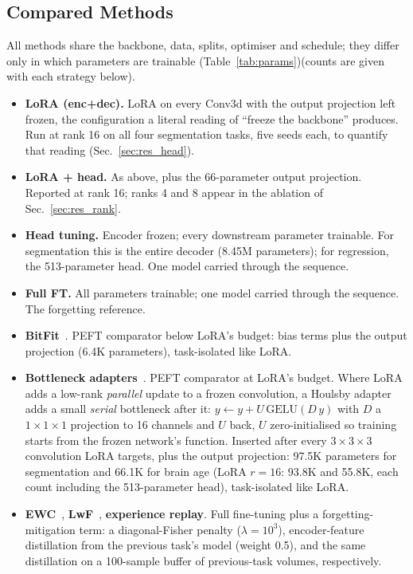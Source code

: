 \iffull\documentclass[journal]{IEEEtran}\else\documentclass[journal,twoside,web]{ieeecolor}\usepackage{generic}\fi
\begin{document}
\subsection{Compared Methods}
\label{sec:baselines}

All methods share the backbone, data, splits, optimiser and schedule; they differ only in which parameters are trainable \iffull(Table~\ref{tab:params})\else(counts are given with each strategy below)\fi.
\begin{itemize}
\item \textbf{LoRA (enc+dec).} LoRA on every Conv3d with the output projection left frozen, the configuration a literal reading of ``freeze the backbone'' produces. Run at rank 16 on all four segmentation tasks, five seeds each, to quantify that reading (Sec.~\ref{sec:res_head}).
\item \textbf{LoRA + head.} As above, plus the 66-parameter output projection. Reported at rank 16; ranks 4 and 8 appear in the ablation of Sec.~\ref{sec:res_rank}.
\item \textbf{Head tuning.} Encoder frozen; every downstream parameter trainable. For segmentation this is the entire decoder (8.45M parameters); for regression, the 513-parameter head. One model carried through the sequence.
\item \textbf{Full FT.} All parameters trainable; one model carried through the sequence. The forgetting reference.
\item \textbf{BitFit}~\cite{bitfit}. PEFT comparator below LoRA's budget: bias terms plus the output projection (6.4K parameters), task-isolated like LoRA.
\item \textbf{Bottleneck adapters}~\cite{houlsby2019}. PEFT comparator at LoRA's budget. Where LoRA adds a low-rank \emph{parallel} update to a frozen convolution, a Houlsby adapter adds a small \emph{serial} bottleneck after it: $y \leftarrow y + U\,\mathrm{GELU}(D\,y)$ with $D$ a $1{\times}1{\times}1$ projection to 16 channels and $U$ back, $U$ zero-initialised so training starts from the frozen network's function. Inserted after every $3{\times}3{\times}3$ convolution LoRA targets, plus the output projection: 97.5K parameters for segmentation and 66.1K for brain age (LoRA $r{=}16$: 93.8K and 55.8K, each count including the 513-parameter head), task-isolated like LoRA.
\item \textbf{EWC}~\cite{kirkpatrick2017}, \textbf{LwF}~\cite{li2017lwf}, \textbf{experience replay}. Full fine-tuning plus a forgetting-mitigation term: a diagonal-Fisher penalty ($\lambda=10^3$), encoder-feature distillation from the previous task's model (weight 0.5), and the same distillation on a 100-sample buffer of previous-task volumes, respectively.

\end{itemize}
\end{document}
